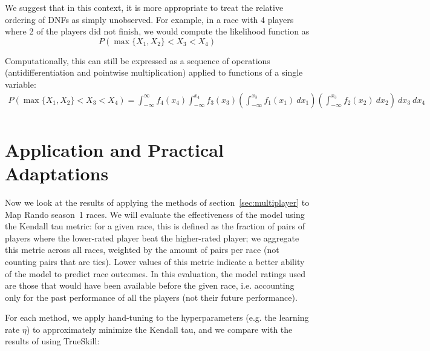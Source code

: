\documentclass{article}
\begin{document}
	We suggest that in this context, it is more appropriate to treat the relative ordering of DNFs as simply unobserved. For example, in a race with 4 players where 2 of the players did not finish, we would compute the likelihood function as
	$$P(\max\{X_1, X_2\} < X_3 < X_4)$$
	
	Computationally, this can still be expressed as a sequence of operations (antidifferentiation and pointwise multiplication) applied to functions of a single variable:
	\begin{align*}
	P(\max\{X_1, X_2\} < X_3 < X_4) = \int_{-\infty}^{\infty} f_4(x_4) \int_{-\infty}^{x_4} f_3(x_3) \left(\int_{-\infty}^{x_3} f_1(x_1)\ dx_1\right)  \left(\int_{-\infty}^{x_3} f_2(x_2)\ dx_2\right)\ dx_3\ dx_4 \\
	\end{align*}
	
	\section{Application and Practical Adaptations}
	Now we look at the results of applying the methods of section~\ref{sec:multiplayer} to Map Rando season~1 races. We will evaluate the effectiveness of the model using the Kendall tau metric: for a given race, this is defined as the fraction of pairs of players where the lower-rated player beat the higher-rated player; we aggregate this metric across all races, weighted by the amount of pairs per race (not counting pairs that are ties). Lower values of this metric indicate a better ability of the model to predict race outcomes. In this evaluation, the model ratings used are those that would have been available before the given race, i.e. accounting only for the past performance of all the players (not their future performance).
	
	For each method, we apply hand-tuning to the hyperparameters (e.g. the learning rate $\eta$) to approximately minimize the Kendall tau, and we compare with the results of using TrueSkill:
	
\end{document}
